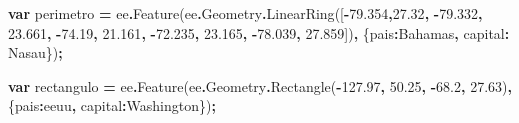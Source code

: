 \documentclass[
  12pt,
  letterpaper,
  twoside]{book}
\newenvironment{Shaded}{\begin{snugshade}}{\end{snugshade}}
\newcommand{\AttributeTok}[1]{\textcolor[rgb]{0.77,0.63,0.00}{#1}}
\newcommand{\DataTypeTok}[1]{\textcolor[rgb]{0.13,0.29,0.53}{#1}}
\newcommand{\FloatTok}[1]{\textcolor[rgb]{0.00,0.00,0.81}{#1}}
\newcommand{\FunctionTok}[1]{\textcolor[rgb]{0.00,0.00,0.00}{#1}}
\newcommand{\KeywordTok}[1]{\textcolor[rgb]{0.13,0.29,0.53}{\textbf{#1}}}
\newcommand{\NormalTok}[1]{#1}
\newcommand{\OperatorTok}[1]{\textcolor[rgb]{0.81,0.36,0.00}{\textbf{#1}}}
\newcommand{\StringTok}[1]{\textcolor[rgb]{0.31,0.60,0.02}{#1}}
\begin{document}
\begin{Shaded}
\begin{Highlighting}[]
\KeywordTok{var}\NormalTok{ perimetro }\OperatorTok{=}\NormalTok{ ee}\OperatorTok{.}\FunctionTok{Feature}\NormalTok{(ee}\OperatorTok{.}\AttributeTok{Geometry}\OperatorTok{.}\FunctionTok{LinearRing}\NormalTok{([}\OperatorTok{{-}}\FloatTok{79.354}\OperatorTok{,}\FloatTok{27.32}\OperatorTok{,}
                                   \OperatorTok{{-}}\FloatTok{79.332}\OperatorTok{,} \FloatTok{23.661}\OperatorTok{,}
                                   \OperatorTok{{-}}\FloatTok{74.19}\OperatorTok{,} \FloatTok{21.161}\OperatorTok{,}
                                   \OperatorTok{{-}}\FloatTok{72.235}\OperatorTok{,} \FloatTok{23.165}\OperatorTok{,}
                                   \OperatorTok{{-}}\FloatTok{78.039}\OperatorTok{,} \FloatTok{27.859}\NormalTok{])}\OperatorTok{,}
\NormalTok{        \{}\DataTypeTok{pais}\OperatorTok{:}\StringTok{\textquotesingle{}Bahamas\textquotesingle{}}\OperatorTok{,}
\DataTypeTok{capital}\OperatorTok{:} \StringTok{\textquotesingle{}Nasau\textquotesingle{}}\NormalTok{\})}\OperatorTok{;}

\KeywordTok{var}\NormalTok{ rectangulo }\OperatorTok{=}\NormalTok{ ee}\OperatorTok{.}\FunctionTok{Feature}\NormalTok{(ee}\OperatorTok{.}\AttributeTok{Geometry}\OperatorTok{.}\FunctionTok{Rectangle}\NormalTok{(}\OperatorTok{{-}}\FloatTok{127.97}\OperatorTok{,} \FloatTok{50.25}\OperatorTok{,}
                                  \OperatorTok{{-}}\FloatTok{68.2}\OperatorTok{,} \FloatTok{27.63}\NormalTok{)}\OperatorTok{,}
\NormalTok{        \{}\DataTypeTok{pais}\OperatorTok{:}\StringTok{\textquotesingle{}eeuu\textquotesingle{}}\OperatorTok{,} 
\DataTypeTok{capital}\OperatorTok{:}\StringTok{\textquotesingle{}Washington\textquotesingle{}}\NormalTok{\})}\OperatorTok{;} 


\end{Highlighting}
\end{Shaded}
\end{document}
